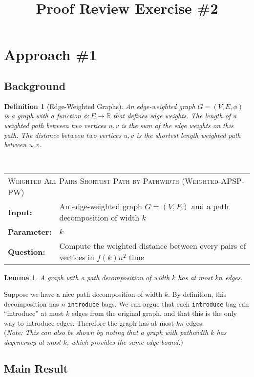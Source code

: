 \documentclass{article}
\title{Proof Review Exercise \#2}
\newcommand{\problem}[1]{\textsc{#1}}
\newtheorem{lemma}{Lemma}
\newtheorem{definition}{Definition}
\newcommand{\defproblem}[4]{%
  \hfill\\\smallskip\noindent%
  \begin{tabularx}{\textwidth}{|l X|}%
    \hline%
    \multicolumn{2}{|l|}{\problem{#1}}\\%
    \textbf{Input:}&#2\\%
    \textbf{Parameter:}&#3\\%
    \textbf{Question:}&#4\smallskip\\\hline%
  \end{tabularx}%
  \smallskip%
}%
\newenvironment{proofsketch}{%
  \renewcommand{\proofname}{Proof Sketch}\proof}{\endproof}
\begin{document}
\maketitle

\section*{Approach \#1}
\subsection*{Background}

\begin{definition}[Edge-Weighted Graphs]
An \emph{edge-weighted} graph $G = (V, E, \phi)$ is a graph with a function $\phi : E \to \mathbb{R}$ that defines edge weights. The \emph{length} of a weighted path between two vertices $u, v$ is the sum of the edge weights on this path. The \emph{distance} between two vertices $u, v$ is the shortest length weighted path between $u, v$.
\end{definition}

\defproblem{Weighted All Pairs Shortest Path by Pathwidth (Weighted-APSP-PW)}
{An edge-weighted graph $G = (V,E)$ and a path decomposition of width $k$}
{$k$}
{Compute the weighted distance between every pairs of vertices in $f(k) n^2$ time}

\begin{lemma}
\label{lemma:edgebound}
A graph with a path decomposition of width $k$ has at most $kn$ edges.
\end{lemma}

\begin{proofsketch}
Suppose we have a nice path decomposition of width $k$. By definition, this decomposition has $n$ \texttt{introduce} bags. We can argue that each \texttt{introduce} bag can ``introduce'' at most $k$ edges from the original graph, and that this is the only way to introduce edges. Therefore the graph has at most $kn$ edges. \\

\noindent (\emph{Note: This can also be shown by noting that a graph with pathwidth $k$ has degeneracy at most $k$, which provides the same edge bound.})
\end{proofsketch}

\subsection*{Main Result}
\end{document}
